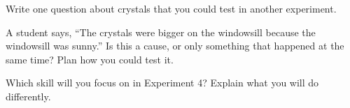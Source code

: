 \task Write one question about crystals that you could test in another experiment. 
\answerbox{3cm}

\begin{yr8box}
\begin{keepext}
\exttask A student says, ``The crystals were bigger on the windowsill because the windowsill was sunny.'' Is this a cause, or only something that happened at the same time? Plan how you could test it.
\answerbox{5cm}
\end{keepext}
\end{yr8box}


\begin{skillcheck}
\end{skillcheck}

\task Which skill will you focus on in Experiment 4? Explain what you will do differently.
\answerbox{5cm}
